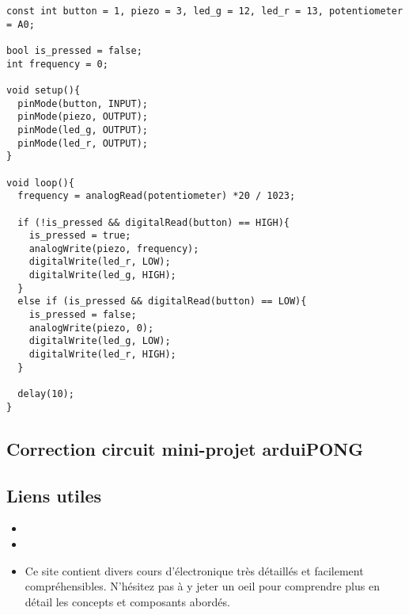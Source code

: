 \begin{tcolorbox}[colback=yellow-atelier!10, colframe=gray!70!black, coltitle=black, colbacktitle=gray!70!white, title={\textit{Bientôt DJ ?}}, leftrule=2mm]
\begin{small}
\begin{verbatim}
const int button = 1, piezo = 3, led_g = 12, led_r = 13, potentiometer = A0;

bool is_pressed = false;
int frequency = 0;

void setup(){
  pinMode(button, INPUT);
  pinMode(piezo, OUTPUT);
  pinMode(led_g, OUTPUT);
  pinMode(led_r, OUTPUT);
}

void loop(){
  frequency = analogRead(potentiometer) *20 / 1023;
  
  if (!is_pressed && digitalRead(button) == HIGH){
    is_pressed = true;
  	analogWrite(piezo, frequency);
    digitalWrite(led_r, LOW);
    digitalWrite(led_g, HIGH);
  }
  else if (is_pressed && digitalRead(button) == LOW){
    is_pressed = false;
  	analogWrite(piezo, 0);
    digitalWrite(led_g, LOW);
    digitalWrite(led_r, HIGH);
  }
  
  delay(10);
}
\end{verbatim}
\end{small}
\end{tcolorbox}


\clearpage
\subsection{Correction circuit mini-projet arduiPONG}


\clearpage
\subsection{Liens utiles}

\begin{itemize}
	\item {}
	\item {}
	\item {}
		  Ce site contient divers cours d'électronique très détaillés et facilement compréhensibles.
		  N'hésitez pas à y jeter un oeil pour comprendre plus en détail les concepts et composants abordés.
\end{itemize}